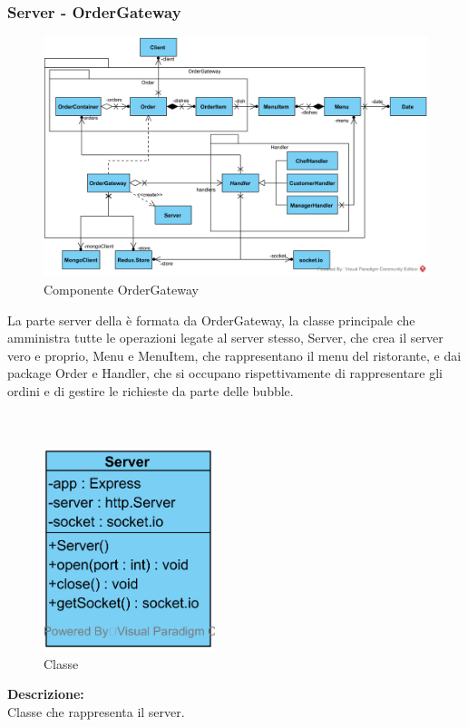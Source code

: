 \subsubsection{Server - OrderGateway}
\begin{figure}[H]
	\centering
	\includegraphics[width=15cm]{./diagrammi/demo/server/ordergatewaypkg.png}
	\caption{Componente OrderGateway}
\end{figure}
La parte server della \DemoName{} è formata da OrderGateway, la classe principale che amministra tutte le operazioni legate al server stesso, Server, che crea il server vero e proprio, Menu e MenuItem, che rappresentano il menu del ristorante, e dai package Order e Handler, che si occupano rispettivamente di rappresentare gli ordini e di gestire le richieste da parte delle bubble. 

\paragraph[::Server]{\class}\mbox{}\\ \label{\class}
\begin{figure}[H]
	\centering
		\includegraphics[width=5cm]{./diagrammi/demo/server/server.png}
	\caption{Classe \class}
\end{figure}
\textbf{Descrizione:}\\
Classe che rappresenta il server.

